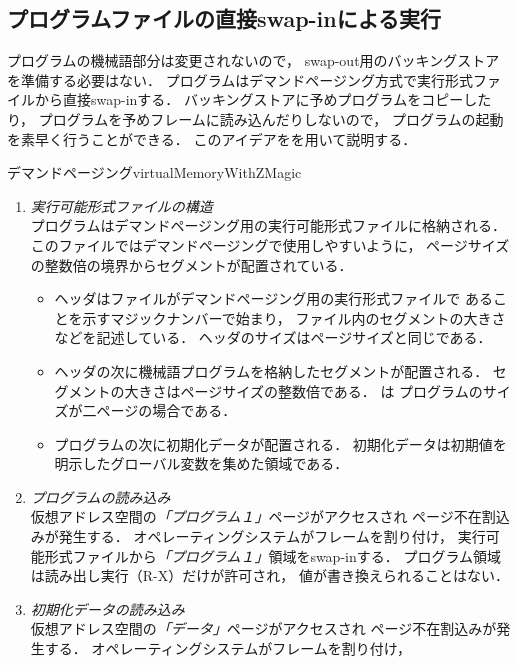 \subsection{プログラムファイルの直接swap-inによる実行}
プログラムの機械語部分は変更されないので，
swap-out用のバッキングストアを準備する必要はない．
プログラムはデマンドページング方式で実行形式ファイルから直接swap-inする．
バッキングストアに予めプログラムをコピーしたり，
プログラムを予めフレームに読み込んだりしないので，
プログラムの起動を素早く行うことができる．
このアイデアをを用いて説明する．

         {デマンドページング}{virtualMemoryWithZMagic}

\begin{enumerate}
\item \emph{実行可能形式ファイルの構造} \\
  プログラムはデマンドページング用の実行可能形式ファイルに格納される．
  このファイルではデマンドページングで使用しやすいように，
  ページサイズの整数倍の境界からセグメントが配置されている．
  \begin{itemize}
  \item ヘッダはファイルがデマンドページング用の実行形式ファイルで
    あることを示すマジックナンバーで始まり，
    ファイル内のセグメントの大きさなどを記述している．
    ヘッダのサイズはページサイズと同じである．
  \item ヘッダの次に機械語プログラムを格納したセグメントが配置される．
    セグメントの大きさはページサイズの整数倍である．
    は
    プログラムのサイズが二ページの場合である．
  \item プログラムの次に初期化データが配置される．
    初期化データは初期値を明示したグローバル変数を集めた領域である．
  \end{itemize}
\item \emph{プログラムの読み込み} \\
  仮想アドレス空間の\emph{「プログラム１」}ページがアクセスされ
  ページ不在割込みが発生する．
  オペレーティングシステムがフレームを割り付け，
  実行可能形式ファイルから\emph{「プログラム１」}領域をswap-inする．
  プログラム領域は読み出し実行（R-X）だけが許可され，
  値が書き換えられることはない．
\item \emph{初期化データの読み込み} \\
  仮想アドレス空間の\emph{「データ」}ページがアクセスされ
  ページ不在割込みが発生する．
  オペレーティングシステムがフレームを割り付け，

\end{enumerate}
